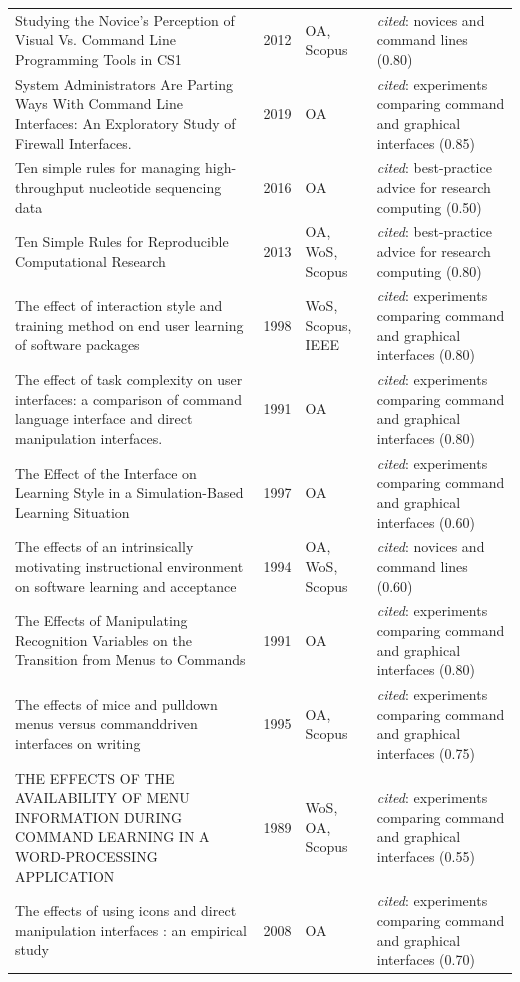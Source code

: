 \begin{longtable}{@{}%
  >{\raggedright\arraybackslash}p{}c%
  >{\raggedright\arraybackslash}p{}%
  >{\raggedright\arraybackslash}p{}@{}}
Studying the Novice's Perception of Visual Vs. Command Line Programming Tools in CS1 & 2012 & OA, Scopus & \emph{cited}: novices and command lines (0.80) \\
System Administrators Are Parting Ways With Command Line Interfaces: An Exploratory Study of Firewall Interfaces. & 2019 & OA & \emph{cited}: experiments comparing command and graphical interfaces (0.85) \\
Ten simple rules for managing high-throughput nucleotide sequencing data & 2016 & OA & \emph{cited}: best-practice advice for research computing (0.50) \\
Ten Simple Rules for Reproducible Computational Research & 2013 & OA, WoS, Scopus & \emph{cited}: best-practice advice for research computing (0.80) \\
The effect of interaction style and training method on end user learning of software packages & 1998 & WoS, Scopus, IEEE & \emph{cited}: experiments comparing command and graphical interfaces (0.80) \\
The effect of task complexity on user interfaces: a comparison of command language interface and direct manipulation interfaces. & 1991 & OA & \emph{cited}: experiments comparing command and graphical interfaces (0.80) \\
The Effect of the Interface on Learning Style in a Simulation-Based Learning Situation & 1997 & OA & \emph{cited}: experiments comparing command and graphical interfaces (0.60) \\
The effects of an intrinsically motivating instructional environment on software learning and acceptance & 1994 & OA, WoS, Scopus & \emph{cited}: novices and command lines (0.60) \\
The Effects of Manipulating Recognition Variables on the Transition from Menus to Commands & 1991 & OA & \emph{cited}: experiments comparing command and graphical interfaces (0.80) \\
The effects of mice and pulldown menus versus commanddriven interfaces on writing & 1995 & OA, Scopus & \emph{cited}: experiments comparing command and graphical interfaces (0.75) \\
THE EFFECTS OF THE AVAILABILITY OF MENU INFORMATION DURING COMMAND LEARNING IN A WORD-PROCESSING APPLICATION & 1989 & WoS, OA, Scopus & \emph{cited}: experiments comparing command and graphical interfaces (0.55) \\
The effects of using icons and direct manipulation interfaces : an empirical study & 2008 & OA & \emph{cited}: experiments comparing command and graphical interfaces (0.70) \\

\end{longtable}
